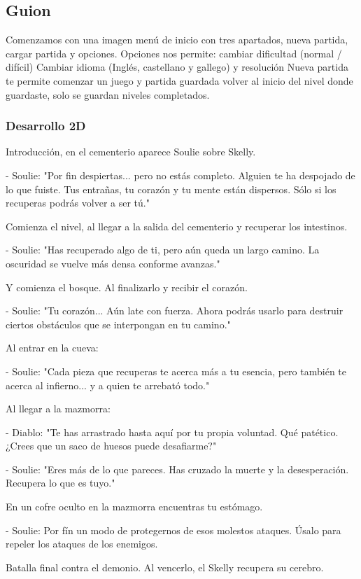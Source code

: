 \documentclass[12pt,a4paper,twoside,spanish]{article}      %
\begin{document}
\subsection{Guion}
Comenzamos con una imagen menú de inicio con tres apartados, nueva partida, cargar partida y opciones.
Opciones nos permite: cambiar dificultad (normal / difícil) Cambiar idioma (Inglés, castellano y gallego) y resolución 
Nueva partida te permite comenzar un juego y partida guardada volver al inicio del nivel donde guardaste, solo se guardan niveles completados.

\subsubsection{Desarrollo 2D}
Introducción, en el cementerio aparece Soulie sobre Skelly.

- Soulie: "Por fin despiertas... pero no estás completo. Alguien te ha despojado de lo que fuiste. Tus entrañas, tu corazón y tu mente están dispersos. Sólo si los recuperas podrás volver a ser tú."

Comienza el nivel, al llegar a la salida del cementerio y recuperar los intestinos.


- Soulie: "Has recuperado algo de ti, pero aún queda un largo camino. La oscuridad se vuelve más densa conforme avanzas."

Y comienza el bosque. Al finalizarlo y recibir el corazón.

- Soulie: "Tu corazón... Aún late con fuerza. Ahora podrás usarlo para destruir ciertos obstáculos que se interpongan en tu camino."

Al entrar en la cueva:

- Soulie: "Cada pieza que recuperas te acerca más a tu esencia, pero también te acerca al infierno... y a quien te arrebató todo."

Al llegar a la mazmorra:

- Diablo: "Te has arrastrado hasta aquí por tu propia voluntad. Qué patético. ¿Crees que un saco de huesos puede desafiarme?"

- Soulie: "Eres más de lo que pareces. Has cruzado la muerte y la desesperación. Recupera lo que es tuyo."

En un cofre oculto en la mazmorra encuentras tu estómago.

- Soulie: Por fín un modo de protegernos de esos molestos ataques. Úsalo para repeler los ataques de los enemigos.

Batalla final contra el demonio. Al vencerlo, el Skelly recupera su cerebro.
\end{document}
